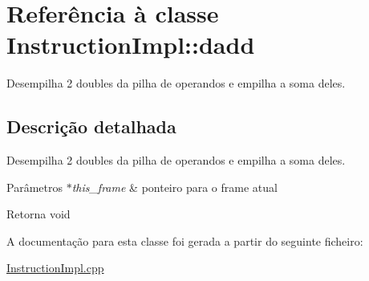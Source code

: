 \hypertarget{class_instruction_impl_1_1dadd}{}\section{Referência à classe Instruction\+Impl\+:\+:dadd}
\label{class_instruction_impl_1_1dadd}


Desempilha 2 doubles da pilha de operandos e empilha a soma deles.  




\subsection{Descrição detalhada}
Desempilha 2 doubles da pilha de operandos e empilha a soma deles. 


\begin{DoxyParams}{Parâmetros}
{\em $\ast$this\+\_\+frame} & ponteiro para o frame atual \\
\hline
\end{DoxyParams}
\begin{DoxyReturn}{Retorna}
void 
\end{DoxyReturn}


A documentação para esta classe foi gerada a partir do seguinte ficheiro\+:\begin{DoxyCompactItemize}
\item 
\hyperlink{_instruction_impl_8cpp}{Instruction\+Impl.\+cpp}\end{DoxyCompactItemize}
